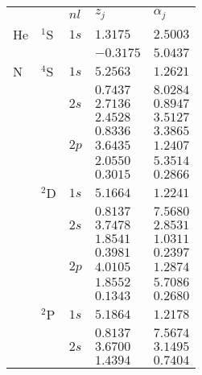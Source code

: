 \begin{table}
\begin{center}
\begin{tabular}{
>{\centering\arraybackslash}p{}
>{\centering\arraybackslash}p{}
>{\centering\arraybackslash}p{}
>{\centering\arraybackslash}p{}
>{\centering\arraybackslash}p{}}
\rowcolor{mydarkgray} 
   &       & $nl$ & $z_j$        & $\alpha_j$   \\
He & $^1$S & $1s$ &  $1.3175$ & $2.5003$  \\\rowcolor{mygray} 
   &       &      & $-0.3175$ & $5.0437$  \\ 
N  & $^4$S & $1s$ & $5.2563$ & $1.2621$  \\\rowcolor{mygray} 
   &       &      & $0.7437$ & $8.0284$  \\ 
   &       & $2s$ & $2.7136$ & $0.8947$ \\\rowcolor{mygray} 
   &       &      & $2.4528$ & $3.5127$  \\
   &       &      & $0.8336$ & $3.3865$  \\ \rowcolor{mygray} 
   &       & $2p$ & $3.6435$ & $1.2407$  \\ 
   &       &      & $2.0550$ & $5.3514$  \\\rowcolor{mygray} 
   &       &      & $0.3015$ & $0.2866$ \\
   & $^2$D & $1s$ & $5.1664$ & $1.2241$  \\\rowcolor{mygray} 
   &       &      & $0.8137$ & $7.5680$  \\ 
   &       & $2s$ & $3.7478$ & $2.8531$  \\\rowcolor{mygray} 
   &       &      & $1.8541$ & $1.0311$  \\ 
   &       &      & $0.3981$ & $0.2397$ \\\rowcolor{mygray} 
   &       & $2p$ & $4.0105$ & $1.2874$  \\ 
   &       &      & $1.8552$ & $5.7086$  \\\rowcolor{mygray} 
   &       &      & $0.1343$ & $0.2680$ \\
   & $^2$P & $1s$ & $5.1864$ & $1.2178$  \\\rowcolor{mygray} 
   &       &      & $0.8137$ & $7.5674$  \\ 
   &       & $2s$ & $3.6700$ & $3.1495$  \\\rowcolor{mygray} 
   &       &      & $1.4394$ & $0.7404$  \\ 

\end{tabular}
\end{center}
\end{table}
